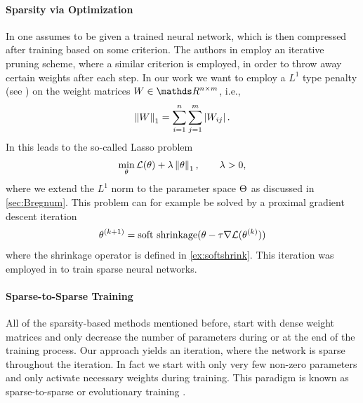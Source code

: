 \paragraph{Sparsity via Optimization} In \cite{lecun1989optimal, hassibi1993optimal} one assumes to be given a trained neural network, which is then compressed after training based on some criterion. The authors in \cite{castellano1997iterative} employ an iterative pruning scheme, where a similar criterion is employed, in order to throw away certain weights after each step. In our work we want to employ a $L^1$ type penalty (see \cite{claerbout1973robust}) on the weight matrices $W\in\R^{n\times m}$, i.e.,
%
\begin{align*}
\left\|W\right\|_1 = \sum_{i=1}^n\sum_{j=1}^m \left|W_{ij}\right|.
\end{align*}
%
In \cite{tibshirani1996regression} this leads to the so-called Lasso problem
%
\begin{align*}
\min_\theta \mathcal{L}(\theta) + \lambda \left\|\theta\right\|_1,\qquad \lambda >0,
\end{align*}
%
where we extend the $L^1$ norm to the parameter space $\Theta$ as discussed in \cref{sec:Bregnum}. This problem can for example be solved by a proximal gradient descent iteration
%
\begin{align}\label{eq:proxgd}
\theta^{(k+1)} = \operatorname{soft\ shrinkage}(\theta - \tau \nabla\mathcal{L}(\theta^{(k)}))
\end{align}
%
where the shrinkage operator is defined in \cref{ex:softshrink}. This iteration was employed in \cite{nitanda2014stochastic, rosasco2014convergence, reddi2016proximal} to train sparse neural networks.
%
%
\paragraph{Sparse-to-Sparse Training} All of the sparsity-based methods mentioned before, start with dense weight matrices and only decrease the number of parameters during or at the end of the training process. Our approach yields an iteration, where the network is sparse throughout the iteration. In fact we start with only very few non-zero parameters and only activate necessary weights during training. This paradigm is known as sparse-to-sparse or evolutionary training \cite{mocanu2018scalable, dettmers2019sparse, Evci2020, dai2019nest, fu2019exploring, huang2016split, liu2021}.
%
%
